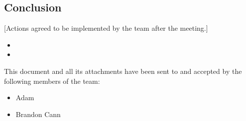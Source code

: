 \documentclass[a4paper]{article}
\begin{document}
\subsection{Conclusion}
[Actions agreed to be implemented by the team after the meeting.]
\begin{itemize}
    \item 
    \item 
\end{itemize}

\vspace*{\fill}
\begin{center}
This document and all its attachments have been sent to and accepted by the following members of the team:
\begin{itemize}
\item Adam
\item Brandon Cann
\end{itemize}
\end{center}
\end{document}
